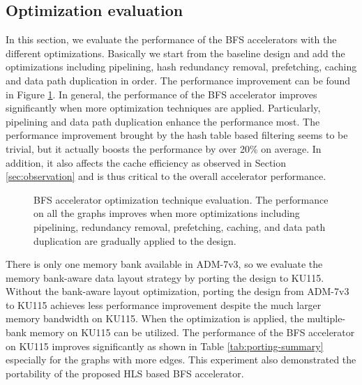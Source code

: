 \subsection{Optimization evaluation}
In this section, we evaluate the 
performance of the BFS accelerators with the different optimizations. 
Basically we start from the baseline design and 
add the optimizations including pipelining, hash redundancy removal, 
prefetching, caching and data path duplication in order. The performance improvement 
can be found in Figure \ref{fig:opt-performance}. 
In general, the performance of the BFS accelerator improves 
significantly when more optimization techniques are applied. Particularly,
pipelining and data path duplication enhance the performance most. 
The performance improvement brought by the hash table based filtering 
seems to be trivial, but it actually boosts the performance by over 20\% on average. 
In addition, it also affects the cache efficiency as observed in Section \ref{sec:observation}
and is thus critical to the overall accelerator performance.


\begin{figure}
	\caption{BFS accelerator optimization technique evaluation. The performance on 
		all the graphs improves when more optimizations including pipelining, 
		redundancy removal, prefetching, caching, and data path duplication are 
	gradually applied to the design.}
	\label{fig:opt-performance}
	\vspace{-1em}
\end{figure}



There is only one memory bank available in ADM-7v3, so we 
evaluate the memory bank-aware data layout strategy by porting the design to KU115.
Without the bank-aware layout optimization, porting the design from ADM-7v3 to 
KU115 achieves less performance improvement despite the much larger memory 
bandwidth on KU115. When the optimization is applied, the multiple-bank memory 
on KU115 can be utilized. The performance of the BFS accelerator on KU115 improves 
significantly as shown in Table \ref{tab:porting-summary} especially for the 
graphs with more edges. This experiment also 
demonstrated the portability of the proposed HLS based BFS accelerator.

